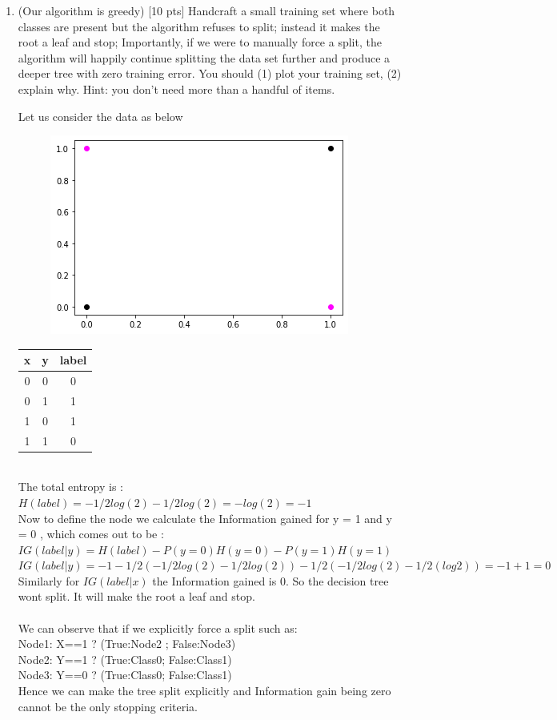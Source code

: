 \documentclass[a4paper]{article}
\theoremstyle{definition}
\newenvironment{soln}{
    \leavevmode\color{blue}\ignorespaces
}{}
\begin{document}
\begin{enumerate}
\item (Our algorithm is greedy)  [10 pts] Handcraft a small training set where both classes are present but the algorithm refuses to split; instead it makes the root a leaf and stop;
Importantly, if we were to manually force a split, the algorithm will happily continue splitting the data set further and produce a deeper tree with zero training error.
You should (1) plot your training set, (2) explain why.  Hint: you don't need more than a handful of items. \\
\begin{soln}
Let us consider the data as below
\begin{figure}[H]
            \centering
            \includegraphics[scale=0.5]{XOR.png}
            \label{fig:q2}
        \end{figure}
\begin{tabular}{|c|c|c|}
            \hline
            x & y & label \\
            \hline
            0 & 0 & 0 \\
            0 & 1 & 1 \\
            1 & 0 & 1 \\
            1 & 1 & 0 \\
            \hline
        \end{tabular}
\\The total entropy is :\\
$H(label)=-1/2log(2)-1/2log(2)=-log(2)=-1$\\
Now to define the node we calculate the Information gained for y = 1 and y = 0 , which comes out to be :\\
$IG(label|y)=H(label)-P(y=0)H(y=0)-P(y=1)H(y=1)$\\
$IG(label|y)=-1-1/2(-1/2log(2)-1/2log(2))-1/2(-1/2log(2)-1/2(log2))=-1+1=0$\\
Similarly for $IG(label|x)$ the Information gained is 0. So the decision tree wont split. It will make the root a leaf and stop.\\
\\ We can observe that if we explicitly force a split such as:\\
Node1: X==1 ? (True:Node2 ;  False:Node3)\\
Node2: Y==1 ? (True:Class0; False:Class1)\\
Node3: Y==0 ? (True:Class0; False:Class1)\\
Hence we can make the tree split explicitly and Information gain being zero cannot be the only stopping criteria.


\end{soln}
\end{enumerate}
\end{document}
